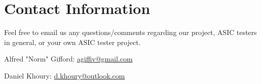 \section{Contact Information}
Feel free to email us any questions/comments regarding our project, ASIC testers in general, or your own ASIC tester project.

\begin{flushleft}
Alfred "Norm" Gifford: \href{mailto:agiffiv@gmail.com}{agiffiv@gmail.com}

Daniel Khoury: \href{mailto:d.khoury@outlook.com}{d.khoury@outlook.com}
\end{flushleft}

\newpage
